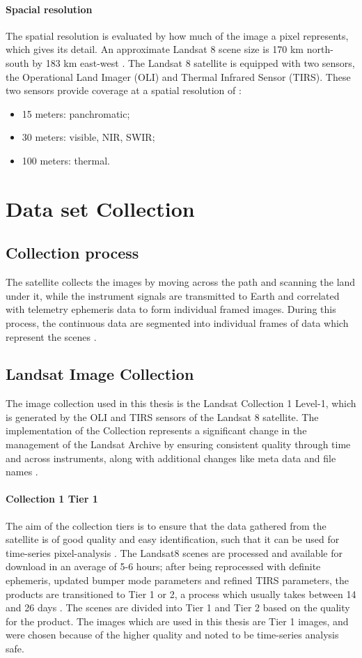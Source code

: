 \documentclass[12pt, a4paper]{report}
\begin{document}
	\paragraph{Spacial resolution}
	The spatial resolution is evaluated by how much of the image a pixel represents, which gives its detail. An approximate Landsat 8 scene size is 170 km north-south by 183 km east-west \cite{oli}. The Landsat 8 satellite is equipped with two sensors, the Operational Land Imager (OLI) and Thermal Infrared Sensor (TIRS). These two sensors provide coverage at a spatial resolution of \cite{wavelength}:
	\begin{itemize}
		\item 15 meters: panchromatic;
		\item 30 meters: visible, NIR, SWIR;
		\item 100 meters: thermal.
	\end{itemize}

	\section{Data set Collection}
	\subsection{Collection process}
	The satellite collects the images by moving across the path and scanning the land under it, while the instrument signals are transmitted to Earth and correlated with telemetry ephemeris data to form individual framed images. During this process, the continuous data are segmented into individual frames of data which represent the scenes \cite{wrs2}. 
	\subsection{Landsat Image Collection}
	The image collection used in this thesis is the Landsat Collection 1 Level-1, which is generated by the OLI and TIRS sensors of the Landsat 8 satellite. The implementation of the Collection represents a significant change in the management of the Landsat Archive by ensuring consistent quality through time and across instruments, along with additional changes like meta data and file names \cite{collection_1}.
	\paragraph{Collection 1 Tier 1}
	The aim of the collection tiers is to ensure that the data gathered from the satellite is of good quality and easy identification, such that it can be used for time-series pixel-analysis \cite{collection_1}. The Landsat8 scenes are processed and available for download in an average of 5-6 hours; after being reprocessed with definite ephemeris, updated bumper mode parameters and refined TIRS parameters, the products are transitioned to Tier 1 or 2, a process which usually takes between 14 and 26 days \cite{collection_1}. The scenes are divided into Tier 1 and Tier 2 based on the quality for the product. The images which are used in this thesis are Tier 1 images, and were chosen because of the higher quality and noted to be time-series analysis safe. 
	
\end{document}
